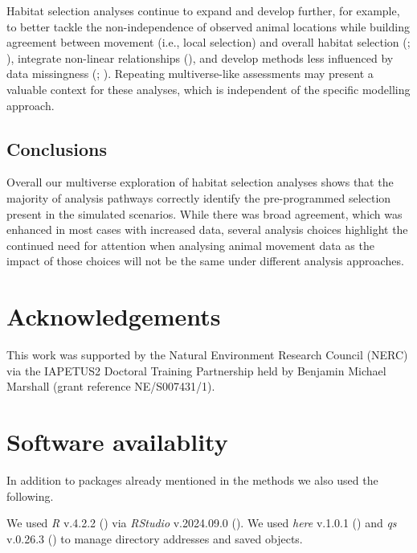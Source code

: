 \documentclass[10pt,a4paper]{article}
\begin{document}
Habitat selection analyses continue to expand and develop further, for example, to better tackle the non-independence of observed animal locations while building agreement between movement (i.e., local selection) and overall habitat selection (; ), integrate non-linear relationships (), and develop methods less influenced by data missingness (; ).
Repeating multiverse-like assessments may present a valuable context for these analyses, which is independent of the specific modelling approach.

\subsection{Conclusions}\label{conclusions}

Overall our multiverse exploration of habitat selection analyses shows that the majority of analysis pathways correctly identify the pre-programmed selection present in the simulated scenarios.
While there was broad agreement, which was enhanced in most cases with increased data, several analysis choices highlight the continued need for attention when analysing animal movement data as the impact of those choices will not be the same under different analysis approaches.

\section{Acknowledgements}\label{acknowledgements}

This work was supported by the Natural Environment Research Council (NERC) via the IAPETUS2 Doctoral Training Partnership held by Benjamin Michael Marshall (grant reference NE/S007431/1).

\section{Software availablity}\label{software-availablity}

In addition to packages already mentioned in the methods we also used the following.

We used \emph{R} v.4.2.2 () via \emph{RStudio} v.2024.09.0 ().
We used \emph{here} v.1.0.1 () and \emph{qs} v.0.26.3 () to manage directory addresses and saved objects.
\end{document}
